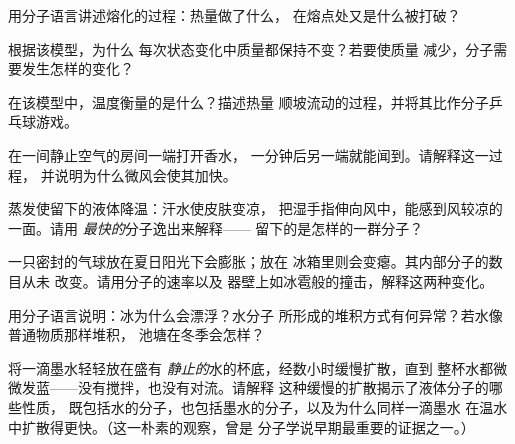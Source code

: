 \begin{exercise}[$\star$]\label{exo:g7:states-of-matter:5}
用分子语言讲述熔化的过程：热量做了什么，
在熔点处又是什么被打破？
\end{exercise}

\begin{exercise}[$\star$]\label{exo:g7:states-of-matter:6}
根据该模型，为什么
每次状态变化中质量都保持不变？若要使质量
减少，分子需要发生怎样的变化？
\end{exercise}

\begin{exercise}[$\star$]\label{exo:g7:states-of-matter:7}
在该模型中，温度衡量的是什么？描述热量
顺坡流动的过程，并将其比作分子乒乓球游戏。
\end{exercise}

\begin{exercise}[$\star$]\label{exo:g7:states-of-matter:8}
在一间静止空气的房间一端打开香水，
一分钟后另一端就能闻到。请解释这一过程，
并说明为什么微风会使其加快。
\end{exercise}

\begin{exercise}[$\star\star$]\label{exo:g7:states-of-matter:9}
蒸发使留下的液体降温：汗水使皮肤变凉，
把湿手指伸向风中，能感到风较凉的一面。请用
\emph{最快的}分子逸出来解释——
留下的是怎样的一群分子？
\end{exercise}

\begin{exercise}[$\star\star$]\label{exo:g7:states-of-matter:10}
一只密封的气球放在夏日阳光下会膨胀；放在
冰箱里则会变瘪。其内部分子的数目从未
改变。请用分子的速率以及
器壁上如冰雹般的撞击，解释这两种变化。
\end{exercise}

\begin{exercise}[$\star\star$]\label{exo:g7:states-of-matter:11}
用分子语言说明：冰为什么会漂浮？水分子
所形成的堆积方式有何异常？若水像普通物质那样堆积，
池塘在冬季会怎样？
\end{exercise}

\begin{exercise}[$\star\star\star$]\label{exo:g7:states-of-matter:12}
将一滴墨水轻轻放在盛有
\emph{静止的}水的杯底，经数小时缓慢扩散，直到
整杯水都微微发蓝——没有搅拌，也没有对流。请解释
这种缓慢的扩散揭示了液体分子的哪些性质，
既包括水的分子，也包括墨水的分子，以及为什么同样一滴墨水
在温水中扩散得更快。（这一朴素的观察，曾是
分子学说早期最重要的证据之一。）
\end{exercise}

